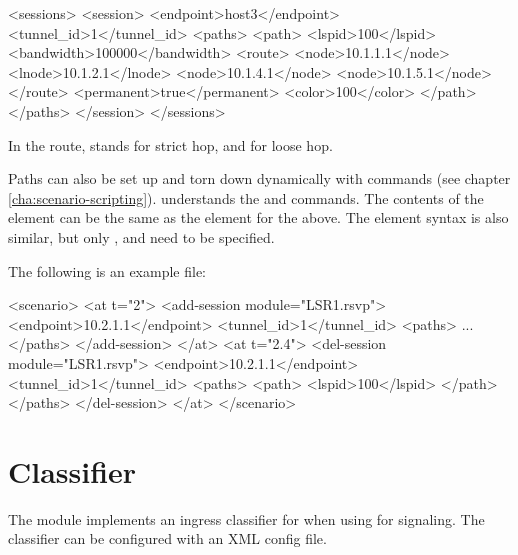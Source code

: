 \begin{XML}
<sessions>
    <session>
        <endpoint>host3</endpoint>
        <tunnel_id>1</tunnel_id>
        <paths>
            <path>
                <lspid>100</lspid>
                <bandwidth>100000</bandwidth>
                <route>
                    <node>10.1.1.1</node>
                    <lnode>10.1.2.1</lnode>
                    <node>10.1.4.1</node>
                    <node>10.1.5.1</node>
                </route>
                <permanent>true</permanent>
                <color>100</color>
            </path>
        </paths>
    </session>
</sessions>
\end{XML}

In the route,  stands for strict hop, and  for loose hop.

Paths can also be set up and torn down dynamically with 
commands (see chapter \ref{cha:scenario-scripting}).
 understands the  and 
 commands. The contents of the 
element can be the same as the  element for the 
above. The  element syntax is also similar, but only
,  and  need to be specified.

The following is an example  file:

\begin{XML}
<scenario>
    <at t="2">
        <add-session module="LSR1.rsvp">
            <endpoint>10.2.1.1</endpoint>
            <tunnel_id>1</tunnel_id>
            <paths>
                ...
            </paths>
        </add-session>
    </at>
    <at t="2.4">
        <del-session module="LSR1.rsvp">
            <endpoint>10.2.1.1</endpoint>
            <tunnel_id>1</tunnel_id>
            <paths>
                <path>
                    <lspid>100</lspid>
                </path>
            </paths>
        </del-session>
    </at>
</scenario>
\end{XML}

\section{Classifier}
\label{sec:mpls:classifier}

The  module implements an ingress classifier for
 when using  for signaling. The classifier can be
configured with an XML config file.

